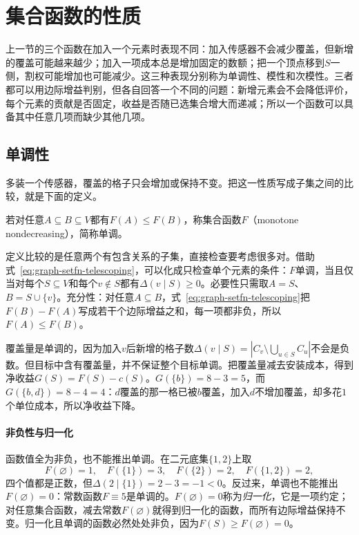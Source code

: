 
\section{集合函数的性质}
\label{sec:graph-set-function-properties}

上一节的三个函数在加入一个元素时表现不同：加入传感器不会减少覆盖，但新增的覆盖可能越来越少；加入一项成本总是增加固定的数额；把一个顶点移到$S$一侧，割权可能增加也可能减少。这三种表现分别称为单调性、模性和次模性。三者都可以用边际增益判别，但各自回答一个不同的问题：新增元素会不会降低评价，每个元素的贡献是否固定，收益是否随已选集合增大而递减；所以一个函数可以具备其中任意几项而缺少其他几项。

\subsection{单调性}
\label{sec:graph-setfn-monotonicity}

多装一个传感器，覆盖的格子只会增加或保持不变。把这一性质写成子集之间的比较，就是下面的定义。

\begin{definition}[单调非减]
\label{def:graph-setfn-monotone}
若对任意$A\subseteq B\subseteq V$都有$F(A)\leq F(B)$，称集合函数$F$（monotone nondecreasing），简称单调。
\end{definition}

定义比较的是任意两个有包含关系的子集，直接检查要考虑很多对。借助式~\eqref{eq:graph-setfn-telescoping}，可以化成只检查单个元素的条件：$F$单调，当且仅当对每个$S\subseteq V$和每个$v\notin S$都有$\Delta(v\mid S)\geq0$。必要性只需取$A=S$、$B=S\cup\{v\}$。充分性：对任意$A\subseteq B$，式~\eqref{eq:graph-setfn-telescoping}把$F(B)-F(A)$写成若干个边际增益之和，每一项都非负，所以$F(A)\leq F(B)$。

覆盖量是单调的，因为加入$v$后新增的格子数$\Delta(v\mid S)=|C_v\setminus\bigcup_{u\in S}C_u|$不会是负数。但目标中含有覆盖量，并不保证整个目标单调。把覆盖量减去安装成本，得到净收益$G(S)=F(S)-c(S)$。$G(\{b\})=8-3=5$，而$G(\{b,d\})=8-4=4$：$d$覆盖的那一格已被$b$覆盖，加入$d$不增加覆盖，却多花$1$个单位成本，所以净收益下降。

\paragraph{非负性与归一化}
函数值全为非负，也不能推出单调。在二元底集$\{1,2\}$上取
\[
  F(\varnothing)=1,\quad F(\{1\})=3,\quad F(\{2\})=2,\quad F(\{1,2\})=2,
\]
四个值都是正数，但$\Delta(2\mid\{1\})=2-3=-1<0$。反过来，单调也不能推出$F(\varnothing)=0$：常数函数$F\equiv5$是单调的。$F(\varnothing)=0$称为\emph{归一化}，它是一项约定；对任意集合函数，减去常数$F(\varnothing)$就得到归一化的函数，而所有边际增益保持不变。归一化且单调的函数必然处处非负，因为$F(S)\geq F(\varnothing)=0$。

